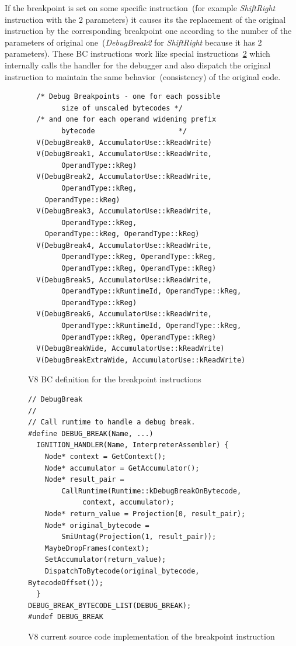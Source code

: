 \documentclass[thesis=M,english]{FITthesis}[2018/10/20]
\begin{document}
If the breakpoint is set on some specific instruction~(for example \textit{ShiftRight} instruction with the 2 parameters) it causes its the replacement of the original instruction by the corresponding breakpoint one according to the number of the parameters of original one~(\textit{DebugBreak2} for \textit{ShiftRight} because it has 2 parameters). These BC instructions work like special instructions~\ref{fig:v8-breakpoint-instruction-implementation} which internally calls the handler for the debugger and also dispatch the original instruction to maintain the same behavior~(consistency) of the original code.

\begin{figure}[!h]
\begin{lstlisting}
  /* Debug Breakpoints - one for each possible
  		size of unscaled bytecodes */
  /* and one for each operand widening prefix
  		bytecode                    */
  V(DebugBreak0, AccumulatorUse::kReadWrite)
  V(DebugBreak1, AccumulatorUse::kReadWrite,
  		OperandType::kReg)
  V(DebugBreak2, AccumulatorUse::kReadWrite,
  		OperandType::kReg,
    OperandType::kReg)
  V(DebugBreak3, AccumulatorUse::kReadWrite,
  		OperandType::kReg,
    OperandType::kReg, OperandType::kReg)
  V(DebugBreak4, AccumulatorUse::kReadWrite,
  		OperandType::kReg, OperandType::kReg,
  		OperandType::kReg, OperandType::kReg)
  V(DebugBreak5, AccumulatorUse::kReadWrite,
  		OperandType::kRuntimeId, OperandType::kReg,
  		OperandType::kReg)
  V(DebugBreak6, AccumulatorUse::kReadWrite,
  		OperandType::kRuntimeId, OperandType::kReg,
  		OperandType::kReg, OperandType::kReg)
  V(DebugBreakWide, AccumulatorUse::kReadWrite)
  V(DebugBreakExtraWide, AccumulatorUse::kReadWrite)
\end{lstlisting}
	\caption{V8 BC definition for the breakpoint instructions}\label{fig:v8-bc-breakpoint-definitions}
\end{figure}

\begin{figure}[!h]
\begin{lstlisting}
// DebugBreak
//
// Call runtime to handle a debug break.
#define DEBUG_BREAK(Name, ...)
  IGNITION_HANDLER(Name, InterpreterAssembler) {
    Node* context = GetContext();
    Node* accumulator = GetAccumulator();
    Node* result_pair =
        CallRuntime(Runtime::kDebugBreakOnBytecode,
        	 context, accumulator);
    Node* return_value = Projection(0, result_pair);
    Node* original_bytecode =
    	SmiUntag(Projection(1, result_pair));
    MaybeDropFrames(context);
    SetAccumulator(return_value);
    DispatchToBytecode(original_bytecode, BytecodeOffset());
  }
DEBUG_BREAK_BYTECODE_LIST(DEBUG_BREAK);
#undef DEBUG_BREAK
\end{lstlisting}
	\caption{V8 current source code implementation of the breakpoint instruction}\label{fig:v8-breakpoint-instruction-implementation}
\end{figure}
\end{document}
